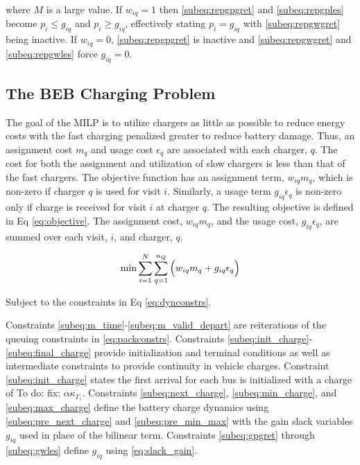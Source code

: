 \documentclass[utf8]{FrontiersinHarvard}
\newcommand{\TODO}[1]{{\color{green} To do: #1}}                                %
\begin{document}
\noindent
where $M$ is a large value. If $w_{iq} = 1$ then \eqref{subeq:repgpgret} and \eqref{subeq:repgples} become $p_i \leq
g_{iq}$ and $p_i \geq g_{iq}$, effectively stating $p_i = g_{iq}$ with \eqref{subeq:repgwgret} being inactive. If $w_{iq} =
0$, \eqref{subeq:repgpgret} is inactive and \eqref{subeq:repgwgret} and \eqref{subeq:repgwles} force $g_{iq} = 0$.

\subsection{The BEB Charging Problem} \label{sec:BEB_MILP}
The goal of the MILP is to utilize chargers as little as possible to reduce energy costs with the fast charging
penalized greater to reduce battery damage. Thus, an assignment cost $m_q$ and usage cost $\epsilon_q$ are associated with each
charger, $q$. The cost for both the assignment and utilization of slow chargers is less than that of the fast chargers.
The objective function has an assignment term, $w_{iq}m_q$, which is non-zero if charger $q$ is used for visit $i$.
Similarly, a usage term $g_{iq} \epsilon_q$ is non-zero only if charge is received for visit $i$ at charger $q$. The resulting
objective is defined in Eq \ref{eq:objective}. The assignment cost, $w_{iq}m_q$, and the usage cost, $g_{iq}\epsilon_q$, are
summed over each visit, $i$, and charger, $q$.

\begin{equation}
\label{eq:objective}
	\min \sum_{i=1}^N \sum_{q=1}^{n_Q} \Big( w_{iq} m_q + g_{iq} \epsilon_q \Big) \\
\end{equation}

Subject to the constraints in Eq \ref{eq:dynconstrs}.



Constraints \eqref{subeq:m_time}-\eqref{subeq:m_valid_depart} are reiterations of the queuing constraints in
\eqref{eq:packconstrs}. Constraints \eqref{subeq:init_charge}-\eqref{subeq:final_charge} provide initialization and
terminal conditions as well as intermediate constraints to provide continuity in vehicle charges. Constraint
\eqref{subeq:init_charge} states the first arrival for each bus is initialized with a charge of \TODO{fix:} $\alpha \kappa_{\Gamma_i}$.
Constraints \eqref{subeq:next_charge}, \eqref{subeq:min_charge}, and \eqref{subeq:max_charge} define the battery charge
dynamics using \eqref{subeq:pre_next_charge} and \eqref{subeq:pre_min_max} with the gain slack variables $g_{iq}$ used
in place of the bilinear term. Constraints \eqref{subeq:gpgret} through \eqref{subeq:gwles} define $g_{iq}$ using
\eqref{eq:slack_gain}.
\end{document}
